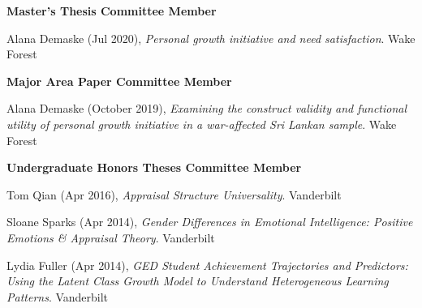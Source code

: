 {\large \textbf{Master's Thesis Committee Member}}%
\begin{etaremune}%
\item Alana Demaske (Jul 2020), \textit{Personal growth initiative and need satisfaction}. Wake Forest%
\end{etaremune}%
%
{\large \textbf{Major Area Paper Committee Member}}%
\begin{etaremune}%
\item Alana Demaske (October 2019), \textit{Examining the construct validity and functional utility of personal growth initiative in a war-affected Sri Lankan sample}. Wake Forest%
\end{etaremune}%
%
{\large \textbf{Undergraduate Honors Theses Committee Member}}
\begin{etaremune}\item Tom Qian (Apr 2016), \textit{Appraisal Structure Universality}. Vanderbilt%
%
\item Sloane Sparks (Apr 2014), \textit{Gender Differences in Emotional Intelligence: Positive Emotions \& Appraisal Theory}. Vanderbilt%
\item Lydia Fuller (Apr 2014), \textit{GED Student Achievement Trajectories and Predictors: Using the Latent Class Growth Model to Understand Heterogeneous Learning Patterns}. Vanderbilt%
\end{etaremune}
